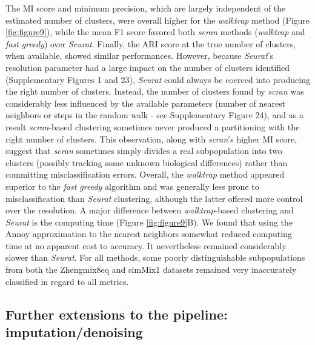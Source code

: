 \documentclass{bmcart}
\begin{document}
The MI score and minimum precision, which are largely independent of the estimated number of clusters, were overall higher for the \textit{walktrap} method (Figure \ref{fig:figure9}), while the mean F1 score favored both \textit{scran} methods (\textit{walktrap} and \textit{fast greedy}) over \textit{Seurat}. Finally, the ARI score at the true number of clusters, when available, showed similar performances. However, because \textit{Seurat}'s resolution parameter had a large impact on the number of clusters identified (Supplementary Figures 1 and 23), \textit{Seurat} could always be coerced into producing the right number of clusters. Instead, the number of clusters found by \textit{scran} was considerably less influenced by the available parameters (number of nearest neighbors or steps in the random walk - see Supplementary Figure 24), and as a result \textit{scran}-based clustering sometimes never produced a partitioning with the right number of clusters. This observation, along with \textit{scran}'s higher MI score, suggest that \textit{scran} sometimes simply divides a real subpopulation into two clusters (possibly tracking some unknown biological differences) rather than committing misclassification errors. Overall, the \textit{walktrap} method appeared superior to the \textit{fast greedy} algorithm and was generally less prone to misclassification than \textit{Seurat} clustering, although the latter offered more control over the resolution. A major difference between \textit{walktrap}-based clustering and \textit{Seurat} is the computing time (Figure \ref{fig:figure9}B). We found that using the Annoy approximation to the nearest neighbors somewhat reduced computing time at no apparent cost to accuracy. It nevertheless remained considerably slower than \textit{Seurat}. For all methods, some poorly distinguishable subpopulations from both the Zhengmix8eq and simMix1 datasets remained very inaccurately classified in regard to all metrics.

\subsection*{Further extensions to the pipeline: imputation/denoising}
\end{document}
